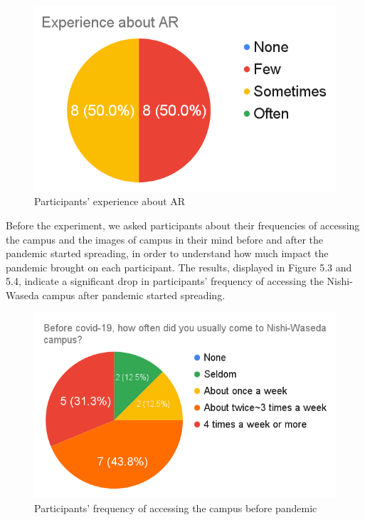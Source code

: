 \begin{figure}[ht]
  \centering
  \includegraphics[width=0.5\columnwidth]{resources/5_experiment_and_results/experience_about_ar.png}
    \caption{Participants' experience about AR}
\end{figure}

Before the experiment, we asked participants about their frequencies of accessing the campus and the images of campus in their mind before and after the pandemic started spreading,
in order to understand how much impact the pandemic brought on each participant.
The results, displayed in Figure 5.3 and 5.4, indicate a significant drop in participants' frequency of accessing the Nishi-Waseda campus after pandemic started spreading.


\begin{figure}[H]
  \centering
  \includegraphics[width=0.8\columnwidth]{resources/5_experiment_and_results/frequency_before_pandemic.png}
    \caption{Participants' frequency of accessing the campus before pandemic}
\end{figure}

